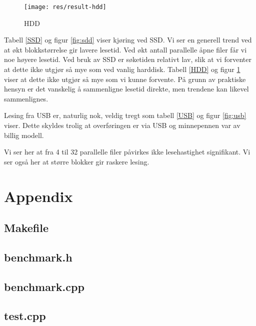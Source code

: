 \documentclass[titlepage]{article}
\begin{document}
\begin{figure}[h!]
  \caption{HDD}
  \label{fig:hdd}
  \centering
  \texttt{[image: res/result-hdd]}
\end{figure}

Tabell \ref{SSD} og figur \ref{fig:sdd} viser kjøring ved SSD. Vi ser
en generell trend ved at økt blokkstørrelse gir lavere lesetid. Ved
økt antall parallelle åpne filer får vi noe høyere lesetid. Ved bruk
av SSD er søketiden relativt lav, slik at vi forventer at dette ikke
utgjør så mye som ved vanlig harddisk. Tabell \ref{HDD} og figur
\ref{fig:hdd} viser at dette ikke utgjør så mye som vi kunne forvente.
På grunn av praktiske hensyn er det vanskelig å sammenligne lesetid
direkte, men trendene kan likevel sammenlignes.

Lesing fra USB er, naturlig nok, veldig tregt som tabell \ref{USB} og
figur \ref{fig:usb} viser. Dette skyldes trolig at overføringen er via
USB og minnepennen var av billig modell.

Vi ser her at fra 4 til 32 parallelle filer påvirkes ikke
lesehastighet signifikant. Vi ser også her at større blokker gir
raskere lesing.



\clearpage
\section{Appendix}
\subsection{Makefile}


\clearpage
\subsection{benchmark.h}


\clearpage
\subsection{benchmark.cpp}


\clearpage
\subsection{test.cpp}

\end{document}
